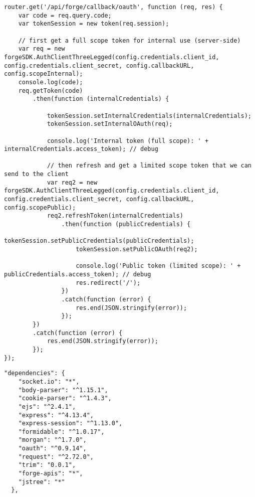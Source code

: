\documentclass[10pt,draftclsnofoot,onecolumn]{IEEEtran}
\begin{document}
\medskip
\begin{lstlisting}[caption=Exchanging Authorization Code for Token function]
router.get('/api/forge/callback/oauth', function (req, res) {
    var code = req.query.code;
    var tokenSession = new token(req.session);

    // first get a full scope token for internal use (server-side)
    var req = new forgeSDK.AuthClientThreeLegged(config.credentials.client_id, config.credentials.client_secret, config.callbackURL, config.scopeInternal);
    console.log(code);
    req.getToken(code)
        .then(function (internalCredentials) {

            tokenSession.setInternalCredentials(internalCredentials);
            tokenSession.setInternalOAuth(req);

            console.log('Internal token (full scope): ' + internalCredentials.access_token); // debug

            // then refresh and get a limited scope token that we can send to the client
            var req2 = new forgeSDK.AuthClientThreeLegged(config.credentials.client_id, config.credentials.client_secret, config.callbackURL, config.scopePublic);
            req2.refreshToken(internalCredentials)
                .then(function (publicCredentials) {
                    tokenSession.setPublicCredentials(publicCredentials);
                    tokenSession.setPublicOAuth(req2);

                    console.log('Public token (limited scope): ' + publicCredentials.access_token); // debug
                    res.redirect('/');
                })
                .catch(function (error) {
                    res.end(JSON.stringify(error));
                });
        })
        .catch(function (error) {
            res.end(JSON.stringify(error));
        });
});
\end{lstlisting}
\begin{lstlisting}[caption=Package depedencies]
  "dependencies": {
    "socket.io": "*",
    "body-parser": "^1.15.1",
    "cookie-parser": "^1.4.3",
    "ejs": "^2.4.1",
    "express": "^4.13.4",
    "express-session": "^1.13.0",
    "formidable": "^1.0.17",
    "morgan": "^1.7.0",
    "oauth": "^0.9.14",
    "request": "^2.72.0",
    "trim": "0.0.1",
    "forge-apis": "*",
    "jstree": "*"
  },
\end{lstlisting}
\end{document}
